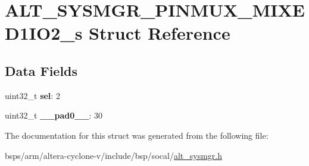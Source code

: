 \hypertarget{structALT__SYSMGR__PINMUX__MIXED1IO2__s}{}\section{A\+L\+T\+\_\+\+S\+Y\+S\+M\+G\+R\+\_\+\+P\+I\+N\+M\+U\+X\+\_\+\+M\+I\+X\+E\+D1\+I\+O2\+\_\+s Struct Reference}
\label{structALT__SYSMGR__PINMUX__MIXED1IO2__s}
\subsection*{Data Fields}
\begin{DoxyCompactItemize}
\item 
\mbox{\label{structALT__SYSMGR__PINMUX__MIXED1IO2__s_afa3c0d65d7f3ff8d3fffbe39cdaab139}} 
uint32\+\_\+t {\bfseries sel}\+: 2
\item 
\mbox{\label{structALT__SYSMGR__PINMUX__MIXED1IO2__s_a48353eaa666d6f52b175066097fe11f2}} 
uint32\+\_\+t {\bfseries \+\_\+\+\_\+pad0\+\_\+\+\_\+}\+: 30
\end{DoxyCompactItemize}


The documentation for this struct was generated from the following file\+:\begin{DoxyCompactItemize}
\item 
bsps/arm/altera-\/cyclone-\/v/include/bsp/socal/\mbox{\hyperlink{alt__sysmgr_8h}{alt\+\_\+sysmgr.\+h}}\end{DoxyCompactItemize}
